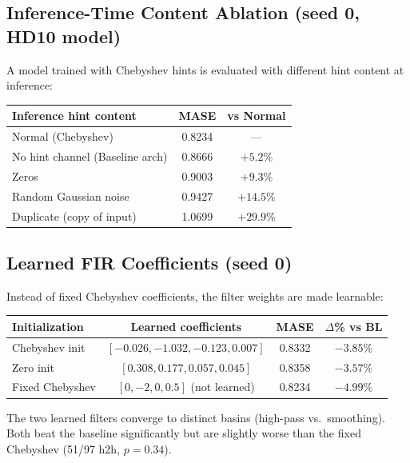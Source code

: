 \documentclass[11pt]{article}
\begin{document}
\subsection{Inference-Time Content Ablation (seed 0, HD10 model)}

A model trained with Chebyshev hints is evaluated with different hint content at inference:

\begin{table}[h]
\centering
\small
\begin{tabular}{lcc}
\toprule
\textbf{Inference hint content} & \textbf{MASE} & \textbf{vs Normal} \\
\midrule
Normal (Chebyshev) & 0.8234 & --- \\
No hint channel (Baseline arch) & 0.8666 & $+5.2\%$ \\
Zeros & 0.9003 & $+9.3\%$ \\
Random Gaussian noise & 0.9427 & $+14.5\%$ \\
Duplicate (copy of input) & 1.0699 & $+29.9\%$ \\
\bottomrule
\end{tabular}
\end{table}

\subsection{Learned FIR Coefficients (seed 0)}

Instead of fixed Chebyshev coefficients, the filter weights are made learnable:

\begin{table}[h]
\centering
\small
\begin{tabular}{lccc}
\toprule
\textbf{Initialization} & \textbf{Learned coefficients} & \textbf{MASE} & \textbf{$\Delta$\% vs BL} \\
\midrule
Chebyshev init & $[-0.026, -1.032, -0.123, 0.007]$ & 0.8332 & $-3.85\%$ \\
Zero init & $[0.308, 0.177, 0.057, 0.045]$ & 0.8358 & $-3.57\%$ \\
Fixed Chebyshev & $[0, -2, 0, 0.5]$ (not learned) & 0.8234 & $-4.99\%$ \\
\bottomrule
\end{tabular}
\end{table}

The two learned filters converge to distinct basins (high-pass vs.\ smoothing). Both beat the baseline significantly but are slightly worse than the fixed Chebyshev (51/97 h2h, $p=0.34$).
\end{document}
